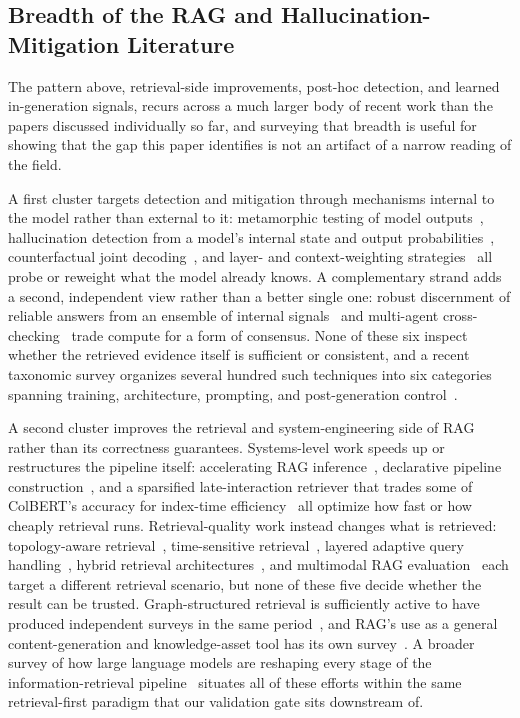\documentclass[conference]{IEEEtran}
\begin{document}
\subsection{Breadth of the RAG and Hallucination-Mitigation Literature}
The pattern above, retrieval-side improvements, post-hoc detection, and
learned in-generation signals, recurs across a much larger body of recent
work than the papers discussed individually so far, and surveying that
breadth is useful for showing that the gap this paper identifies is not an
artifact of a narrow reading of the field.

A first cluster targets detection and mitigation through mechanisms
internal to the model rather than external to it: metamorphic testing of
model outputs~\cite{yang2025metamorphic}, hallucination detection from a
model's internal state and output probabilities~\cite{li2025mixhd},
counterfactual joint decoding~\cite{liu2026isfjrag}, and layer- and
context-weighting strategies~\cite{yu2025context} all probe or reweight
what the model already knows. A complementary strand adds a second,
independent view rather than a better single one: robust discernment of
reliable answers from an ensemble of internal
signals~\cite{zhang2023hallucinationrobust} and multi-agent
cross-checking~\cite{darwish2025multiagent} trade compute for a form of
consensus. None of these six inspect whether the retrieved evidence itself
is sufficient or
consistent, and a recent taxonomic survey organizes several hundred such
techniques into six categories spanning training, architecture, prompting,
and post-generation control~\cite{kazlaris2025taxonomy}.

A second cluster
improves the retrieval and system-engineering side of RAG rather than its
correctness guarantees. Systems-level work speeds up or restructures the
pipeline itself: accelerating RAG
inference~\cite{quinn2025accelerating}, declarative pipeline
construction~\cite{macdonald2025pyterrier}, and a sparsified
late-interaction retriever that trades some of ColBERT's accuracy for
index-time efficiency~\cite{formal2024splate} all optimize how fast or how
cheaply retrieval runs. Retrieval-quality work instead changes what is
retrieved: topology-aware
retrieval~\cite{wang2024topology}, time-sensitive
retrieval~\cite{wu2024timesensitive}, layered adaptive query
handling~\cite{huang2024layered}, hybrid retrieval
architectures~\cite{omrani2024hybrid}, and multimodal RAG
evaluation~\cite{sun2024multimodal} each target a different retrieval
scenario, but none of these five decide whether the result can be
trusted. Graph-structured retrieval is
sufficiently active to have produced independent surveys in the same
period~\cite{peng2025graphrag, procko2024graphrag}, and RAG's use as a
general content-generation and knowledge-asset tool has its own
survey~\cite{zhao2026aigc, james2025knowledgeassets}. A broader survey of
how large language models are reshaping every stage of the
information-retrieval pipeline~\cite{zhu2025llmir} situates all of these
efforts within the same retrieval-first paradigm that our validation gate
sits downstream of.
\end{document}
